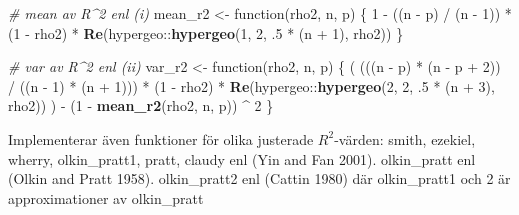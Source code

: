\documentclass[]{article}
\newenvironment{Shaded}{\begin{snugshade}}{\end{snugshade}}
\newcommand{\KeywordTok}[1]{\textcolor[rgb]{0.13,0.29,0.53}{\textbf{{#1}}}}
\newcommand{\DecValTok}[1]{\textcolor[rgb]{0.00,0.00,0.81}{{#1}}}
\newcommand{\StringTok}[1]{\textcolor[rgb]{0.31,0.60,0.02}{{#1}}}
\newcommand{\CommentTok}[1]{\textcolor[rgb]{0.56,0.35,0.01}{\textit{{#1}}}}
\newcommand{\NormalTok}[1]{{#1}}
\begin{document}
\begin{Shaded}
\begin{Highlighting}[]
\CommentTok{# mean av R^2 enl (i)}
\NormalTok{mean_r2 <-}\StringTok{ }\NormalTok{function(rho2, n, p) \{}
  \DecValTok{1} \NormalTok{-}\StringTok{ }\NormalTok{((n -}\StringTok{ }\NormalTok{p) /}\StringTok{ }\NormalTok{(n -}\StringTok{ }\DecValTok{1}\NormalTok{)) *}\StringTok{ }\NormalTok{(}\DecValTok{1} \NormalTok{-}\StringTok{ }\NormalTok{rho2) *}\StringTok{ }\KeywordTok{Re}\NormalTok{(hypergeo::}\KeywordTok{hypergeo}\NormalTok{(}\DecValTok{1}\NormalTok{, }\DecValTok{2}\NormalTok{, .}\DecValTok{5} \NormalTok{*}\StringTok{ }\NormalTok{(n +}\StringTok{ }\DecValTok{1}\NormalTok{), rho2))}
\NormalTok{\}}

\CommentTok{# var av R^2 enl (ii)}
\NormalTok{var_r2 <-}\StringTok{ }\NormalTok{function(rho2, n, p) \{}
  \NormalTok{(}
    \NormalTok{(((n -}\StringTok{ }\NormalTok{p) *}\StringTok{ }\NormalTok{(n -}\StringTok{ }\NormalTok{p +}\StringTok{ }\DecValTok{2}\NormalTok{)) /}\StringTok{ }\NormalTok{((n -}\StringTok{ }\DecValTok{1}\NormalTok{) *}\StringTok{ }\NormalTok{(n +}\StringTok{ }\DecValTok{1}\NormalTok{))) *}\StringTok{ }
\StringTok{      }\NormalTok{(}\DecValTok{1} \NormalTok{-}\StringTok{ }\NormalTok{rho2) *}\StringTok{ }
\StringTok{      }\KeywordTok{Re}\NormalTok{(hypergeo::}\KeywordTok{hypergeo}\NormalTok{(}\DecValTok{2}\NormalTok{, }\DecValTok{2}\NormalTok{, .}\DecValTok{5} \NormalTok{*}\StringTok{ }\NormalTok{(n +}\StringTok{ }\DecValTok{3}\NormalTok{), rho2))}
  \NormalTok{) -}\StringTok{ }\NormalTok{(}\DecValTok{1} \NormalTok{-}\StringTok{ }\KeywordTok{mean_r2}\NormalTok{(rho2, n, p)) ^}\StringTok{ }\DecValTok{2}
\NormalTok{\}}
\end{Highlighting}
\end{Shaded}

Implementerar även funktioner för olika justerade \(R^2\)-värden: smith,
ezekiel, wherry, olkin\_pratt1, pratt, claudy enl (Yin and Fan 2001).
olkin\_pratt enl (Olkin and Pratt 1958). olkin\_pratt2 enl (Cattin 1980)
där olkin\_pratt1 och 2 är approximationer av olkin\_pratt
\end{document}
